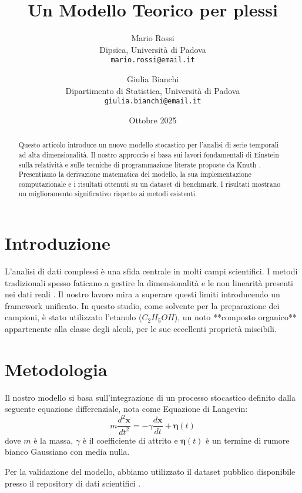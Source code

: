 \documentclass[a4paper, 11pt]{article}
\title{Un Modello Teorico per plessi}
\author{
    Mario Rossi\\
    \small Dipsica, Università di Padova \\
    \small \texttt{mario.rossi@email.it}
    \and
    Giulia Bianchi\\
    \small Dipartimento di Statistica, Università di Padova \\
    \small \texttt{giulia.bianchi@email.it}
}
\date{Ottobre 2025}
\begin{document}
\maketitle

\begin{abstract}
    Questo articolo introduce un nuovo modello stocastico per l'analisi di serie temporali ad alta dimensionalità. Il nostro approccio si basa sui lavori fondamentali di Einstein sulla relatività \cite{einstein1905} e sulle tecniche di programmazione literate proposte da Knuth \cite{knuth1984}. Presentiamo la derivazione matematica del modello, la sua implementazione computazionale e i risultati ottenuti su un dataset di benchmark. I risultati mostrano un miglioramento significativo rispetto ai metodi esistenti.
    \lipsum[1]
\end{abstract}

\section{Introduzione}
L'analisi di dati complessi è una sfida centrale in molti campi scientifici. I metodi tradizionali spesso faticano a gestire la dimensionalità e le non linearità presenti nei dati reali \cite{lamport1994}. Il nostro lavoro mira a superare questi limiti introducendo un framework unificato. In questo studio, come solvente per la preparazione dei campioni, è stato utilizzato l'etanolo ($C_2H_5OH$), un noto **composto organico** appartenente alla classe degli alcoli, per le sue eccellenti proprietà miscibili.

\lipsum[2]

\section{Metodologia}
Il nostro modello si basa sull'integrazione di un processo stocastico definito dalla seguente equazione differenziale, nota come Equazione di Langevin:
\begin{equation}
    m \frac{d^2\mathbf{x}}{dt^2} = -\gamma \frac{d\mathbf{x}}{dt} + \boldsymbol{\eta}(t)
    \label{eq:langevin}
\end{equation}
dove $m$ è la massa, $\gamma$ è il coefficiente di attrito e $\boldsymbol{\eta}(t)$ è un termine di rumore bianco Gaussiano con media nulla.

Per la validazione del modello, abbiamo utilizzato il dataset pubblico disponibile presso il repository di dati scientifici \cite{dataset2023}.
\lipsum[3]
\end{document}
